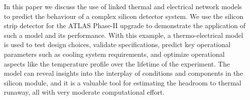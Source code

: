 
%
%

In this paper we discuss the use of linked thermal and electrical network models to predict the behaviour of a complex silicon detector system. We use the silicon strip detector for the ATLAS Phase-II upgrade to demonstrate the application of such a model and its performance. With this example, a thermo-electrical model is used to test design choices, validate specifications, predict key operational parameters such as cooling system requirements, and optimize operational aspects like the temperature profile over the lifetime of the experiment. The model can reveal insights into the interplay of conditions and components in the silicon module, and it is a valuable tool for estimating the headroom to thermal runaway, all with very moderate computational effort.
